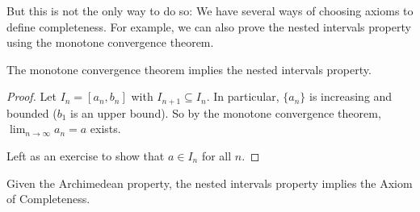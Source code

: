 But this is not the only way to do so: We have several
ways of choosing axioms to define completeness. For example,
we can also prove the nested intervals property using
the monotone convergence theorem.

\begin{exercise}
  The monotone convergence theorem implies the nested
  intervals property.
\end{exercise}

\begin{proof}
  Let $I_n = [a_n, b_n]$ with $I_{n+1} \subseteq I_n$.
  In particular, $\{a_n\}$ is increasing and
  bounded ($b_1$ is an upper bound). So by
  the monotone convergence theorem,
  $\lim_{n \to \infty} a_n = a$ exists.

  Left as an exercise to show that $a \in I_n$ for
  all $n$.
\end{proof}

\begin{exercise}
  Given the Archimedean property,
  the nested intervals property implies the Axiom of
  Completeness.
\end{exercise}

